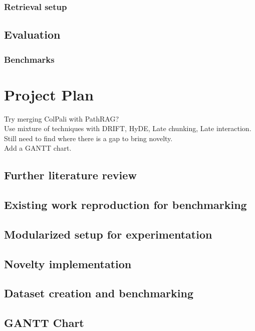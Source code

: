 \documentclass[12pt,twoside]{report}
\begin{document}
\subsection{Retrieval setup}

\section{Evaluation}

\subsection{Benchmarks}

\chapter{Project Plan}

Try merging ColPali with PathRAG? \\
Use mixture of techniques with DRIFT, HyDE, Late chunking, Late interaction. \\
Still need to find where there is a gap to bring novelty. \\
Add a GANTT chart.

\section{Further literature review}

\section{Existing work reproduction for benchmarking}

\section{Modularized setup for experimentation}

\section{Novelty implementation}

\section{Dataset creation and benchmarking}

\section{GANTT Chart}


\end{document}
